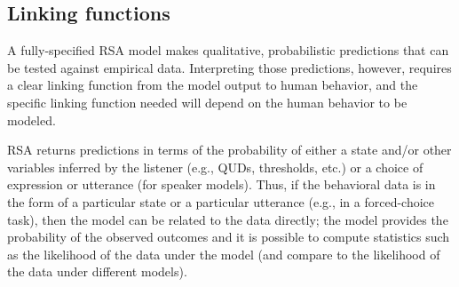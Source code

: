 \documentclass[10pt,letterpaper]{article}
\begin{document}
\subsection*{Linking functions}

A fully-specified RSA model makes qualitative, probabilistic predictions that can be tested against empirical data.
Interpreting those predictions, however, requires a clear linking function from the model output to human behavior, and the specific linking function needed will depend on the human behavior to be modeled.


RSA returns predictions in terms of the probability of either a state and/or other variables inferred by the listener (e.g., QUDs, thresholds, etc.) or a choice of expression or utterance (for speaker models).
Thus, if the behavioral data is in the form of a particular state or a particular utterance (e.g., in a forced-choice task), then the model can be related to the data directly; the model provides the probability of the observed outcomes and it is possible to compute statistics such as the likelihood of the data under the model (and compare to the likelihood of the data under different models). 
\end{document}
